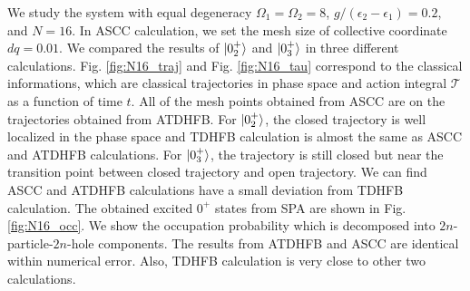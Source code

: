 \documentclass[%
superscriptaddress,
showpacs,
nofootinbib,
amsmath,amssymb,
aps,
prc,
twocolumn,
floatfix ]%
{revtex4-1}
\begin{document}
We study the system with equal degeneracy $\Omega_1=\Omega_2=8$, $g/(\epsilon_2-\epsilon_1)=0.2$, and $N=16$. In ASCC calculation, we set the mesh size of collective coordinate $dq=0.01$. We compared the results of $\ket{0_2^+}$ and $\ket{0_3^+}$ in three different calculations. Fig. \ref{fig:N16_traj} and Fig. \ref{fig:N16_tau} correspond to the classical informations, which are classical trajectories in phase space and action integral $\mathcal{T}$ as a function of time $t$. All of the mesh points obtained from ASCC are on the trajectories obtained from ATDHFB. For $\ket{0_2^+}$, the closed trajectory is well localized in the phase space and TDHFB calculation is almost the same as ASCC and ATDHFB calculations. For $\ket{0_3^+}$, the trajectory is still closed but near the transition point between closed trajectory and open trajectory. We can find ASCC and ATDHFB calculations have a small deviation from TDHFB calculation. The obtained excited $0^+$ states from SPA are shown in Fig. \ref{fig:N16_occ}. We show the occupation probability which is decomposed into $2n$-particle-$2n$-hole components. The results from ATDHFB and ASCC are identical within numerical error. Also, TDHFB calculation is very close to other two calculations. 
\end{document}
